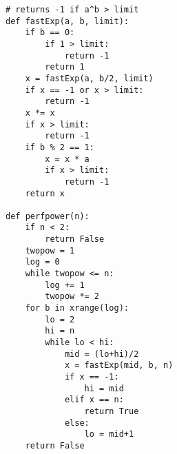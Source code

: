\documentclass[11pt]{article}
\begin{document}
\begin{verbatim}
# returns -1 if a^b > limit
def fastExp(a, b, limit):
    if b == 0:
        if 1 > limit:
            return -1
        return 1
    x = fastExp(a, b/2, limit)
    if x == -1 or x > limit:
        return -1
    x *= x
    if x > limit:
        return -1
    if b % 2 == 1:
        x = x * a
        if x > limit:
            return -1
    return x

def perfpower(n):
    if n < 2:
        return False
    twopow = 1
    log = 0
    while twopow <= n:
        log += 1
        twopow *= 2
    for b in xrange(log):
        lo = 2
        hi = n
        while lo < hi:
            mid = (lo+hi)/2
            x = fastExp(mid, b, n)
            if x == -1:
                hi = mid
            elif x == n:
                return True
            else:
                lo = mid+1
    return False
\end{verbatim}
\end{document}
